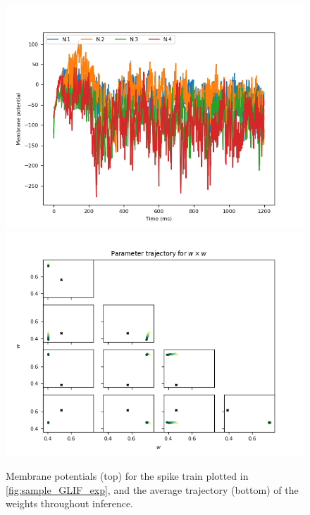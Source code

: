 \documentclass[mphil,deptreport,ianc]{infthesis} %
\begin{document}
\begin{figure}
    \centering
    \vspace{-0.1in}
    \includegraphics[width=0.9\linewidth]{figures/samples/GLIF/12-09_16-14-54-627/membrane_pots_train_i_100.png}
    \vspace{-0.1in}
    \includegraphics[width=0.9\linewidth]{figures/samples/GLIF/12-09_16-14-54-627/test_weights_inference_trajectories_param_w.png}
    \vspace{-0.1in}
    \caption{Membrane potentials (top) for the spike train plotted in \ref{fig:sample_GLIF_exp}, and the average trajectory (bottom) of the weights throughout inference.}
    \label{fig:sample_GLIF_exp_vs_traject}
\end{figure}
\end{document}
